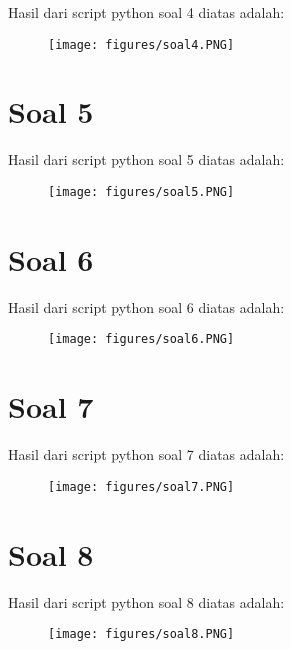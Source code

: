 \par Hasil dari script python soal 4 diatas adalah: 
\begin{figure}[!htbp]
    \centering
    \texttt{[image: figures/soal4.PNG]}
    \label{soal4}
\end{figure}

\section{Soal 5}


\par Hasil dari script python soal 5 diatas adalah: 
\begin{figure}[!htbp]
    \centering
    \texttt{[image: figures/soal5.PNG]}
    \label{soal5}
\end{figure}

\section{Soal 6}


\par Hasil dari script python soal 6 diatas adalah: 
\begin{figure}[!htbp]
    \centering
    \texttt{[image: figures/soal6.PNG]}
    \label{soal6}
\end{figure}

\section{Soal 7}


\par Hasil dari script python soal 7 diatas adalah: 
\begin{figure}[!htbp]
    \centering
    \texttt{[image: figures/soal7.PNG]}
    \label{soal7}
\end{figure}

\section{Soal 8}


\par Hasil dari script python soal 8 diatas adalah: 
\begin{figure}[!htbp]
    \centering
    \texttt{[image: figures/soal8.PNG]}
    \label{soal8}
\end{figure}

